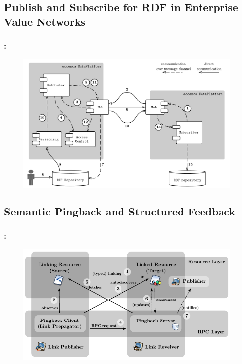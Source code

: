 \documentclass[aspectratio=169,hideallsubsections]{beamer}
\begin{document}
\subsection{Publish and Subscribe for RDF in Enterprise Value Networks}
\begin{frame}
  \frametitle{\insertsection: \insertsubsection}%

    \begin{figure}
     \begin{center}
     \includegraphics[width=.8\textwidth]{elds}
     \end{center}
    \end{figure}

\end{frame}

\subsection{Semantic Pingback and Structured Feedback}
\begin{frame}
  \frametitle{\insertsection: \insertsubsection}%

    \begin{figure}
     \begin{center}
     \includegraphics[width=.8\textwidth]{pingback}
     \end{center}
    \end{figure}

\end{frame}
\end{document}
